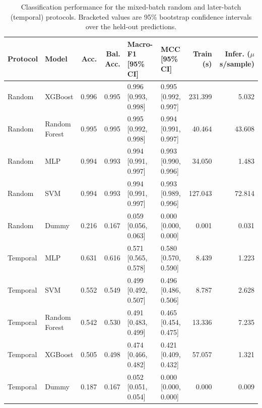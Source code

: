 \documentclass[conference]{IEEEtran}
\begin{document}
\begin{table}[t]
\caption{Classification performance for the mixed-batch random and later-batch (temporal) protocols. Bracketed values are 95\% bootstrap confidence intervals over the held-out predictions.}
\label{tab:classification}
\centering
\scriptsize
\begin{tabular}{llrrllrr}
\toprule
Protocol & Model & Acc. & Bal. Acc. & Macro-F1 [95\% CI] & MCC [95\% CI] & Train (s) & Infer. ($\mu$s/sample) \\
\midrule
Random & XGBoost & 0.996 & 0.995 & 0.996 [0.993, 0.998] & 0.995 [0.992, 0.997] & 231.399 & 5.032 \\
Random & Random Forest & 0.995 & 0.995 & 0.995 [0.992, 0.998] & 0.994 [0.991, 0.997] & 40.464 & 43.608 \\
Random & MLP & 0.994 & 0.993 & 0.994 [0.991, 0.997] & 0.993 [0.990, 0.996] & 34.050 & 1.483 \\
Random & SVM & 0.994 & 0.993 & 0.994 [0.991, 0.997] & 0.993 [0.989, 0.996] & 127.043 & 72.814 \\
Random & Dummy & 0.216 & 0.167 & 0.059 [0.056, 0.063] & 0.000 [0.000, 0.000] & 0.001 & 0.031 \\
\midrule
Temporal & MLP & 0.631 & 0.616 & 0.571 [0.565, 0.578] & 0.580 [0.570, 0.590] & 8.439 & 1.223 \\
Temporal & SVM & 0.552 & 0.549 & 0.499 [0.492, 0.507] & 0.496 [0.486, 0.506] & 8.787 & 2.628 \\
Temporal & Random Forest & 0.542 & 0.530 & 0.491 [0.483, 0.499] & 0.465 [0.454, 0.475] & 13.336 & 7.235 \\
Temporal & XGBoost & 0.505 & 0.498 & 0.474 [0.466, 0.482] & 0.421 [0.409, 0.432] & 57.057 & 1.321 \\
Temporal & Dummy & 0.187 & 0.167 & 0.052 [0.051, 0.054] & 0.000 [0.000, 0.000] & 0.000 & 0.009 \\
\bottomrule
\end{tabular}
\end{table}
\end{document}
